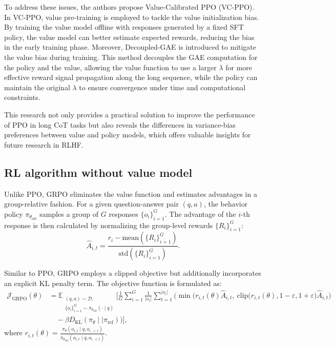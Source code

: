 To address these issues, the authors propose Value-Calibrated PPO (VC-PPO). In VC-PPO, value pre-training is employed to tackle the value initialization bias. By training the value model offline with responses generated by a fixed SFT policy, the value model can better estimate expected rewards, reducing the bias in the early training phase. Moreover, Decoupled-GAE is introduced to mitigate the value bias during training. This method decouples the GAE computation for the policy and the value, allowing the value function to use a larger $\lambda$ for more effective reward signal propagation along the long sequence, while the policy can maintain the original $\lambda$ to ensure convergence under time and computational constraints.

This research not only provides a practical solution to improve the performance of PPO in long CoT tasks but also reveals the differences in variance-bias preferences between value and policy models, which offers valuable insights for future research in RLHF.

\subsection{RL algorithm without value model}
Unlike PPO, GRPO eliminates the value function and estimates advantages in a group-relative fashion. For a given question-answer pair \((q, a)\), the behavior policy \(\pi_{\theta_{\text{old}}}\) samples a group of \(G\) responses \(\{ o_i \}_{i=1}^G\). The advantage of the \(i\)-th response is then calculated by normalizing the group-level rewards \(\{ R_i \}_{i=1}^G\):
\[
\hat{A}_{i,t} = \frac{r_i-\text{mean}(\{R_i\}_{i=1}^G)}{\text{std}(\{R_i\}_{i=1}^G)}.
\]

Similar to PPO, GRPO employs a clipped objective but additionally incorporates an explicit KL penalty term. The objective function is formulated as:
\[
\begin{aligned}
\mathcal{J}_\text{GRPO}(\theta) &= \mathbb{E}_{\substack{(q,a) \sim \mathcal{D}, \\ \{o_i\}_{i=1}^G \sim \pi_{\theta_{\text{old}}}(\cdot \mid q)}} \Bigg[ \frac{1}{G} \sum_{i=1}^{G} \frac{1}{|o_i|} \sum_{t=1}^{|o_i|} \Bigg( 
\min \Big( r_{i,t}(\theta) \hat{A}_{i,t},  
\ \text{clip} \Big( r_{i,t}(\theta), 1-\varepsilon, 1 + \varepsilon \Big) \hat{A}_{i,t} \Big) \\
&\quad-\beta D_{\text{KL}}(\pi_{\theta} \mid\mid \pi_{\text{ref}}) 
\Bigg) \Bigg],
\end{aligned}
\]
where \(r_{i,t}(\theta) = \frac{\pi_{\theta}(o_{i,t} \mid q, o_{i,<t})}{\pi_{\theta_{\text{old}}}(o_{i,t} \mid q, o_{i,<t})}\).

